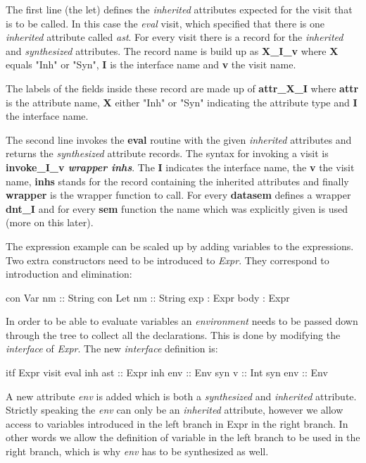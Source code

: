The first line (the let) defines the \emph{inherited} attributes expected for the visit that is to be called. In this case the \emph{eval} visit, which specified that there is one \emph{inherited} attribute called \emph{ast}. For every visit there is a record for the \emph{inherited} and \emph{synthesized} attributes. The record name is build up as \textbf{X\_I\_v} where \textbf{X} equals "Inh" or "Syn", \textbf{I} is the interface name and \textbf{v} the visit name.

The labels of the fields inside these record are made up of \textbf{attr\_X\_I} where \textbf{attr} is the attribute name, \textbf{X} either "Inh" or "Syn" indicating the attribute type and \textbf{I} the interface name.

The second line invokes the \textbf{eval} routine with the given \emph{inherited} attributes and returns the \emph{synthesized} attribute records. The syntax for invoking a visit is \textbf{invoke\_I\_v \emph{wrapper inhs}}. The \textbf{I} indicates the interface name, the \textbf{v} the visit name, \textbf{inhs} stands for the record containing the inherited attributes and finally \textbf{wrapper} is the wrapper function to call. For every \textbf{datasem} \rcore defines a wrapper \textbf{dnt\_I} and for every \textbf{sem} function the name which was explicitly given is used (more on this later).

The expression example can be scaled up by adding variables to the expressions. Two extra constructors need to be introduced to \emph{Expr}. They correspond to introduction and elimination:	

\begin{code}
  con Var
    nm      :: String
  con Let
    nm      :: String
    exp     :  Expr
    body    :  Expr
\end{code}

In order to be able to evaluate variables an \emph{environment} needs to be passed down through the tree to collect all the declarations. This is done by modifying the \emph{interface} of \emph{Expr}. The new \emph{interface} definition is:

\begin{code}
itf Expr
  visit eval 
    inh ast  :: Expr
    inh env  :: Env
    syn v    :: Int
    syn env  :: Env
\end{code}

A new attribute \emph{env} is added which is both a \emph{synthesized} and \emph{inherited} attribute. Strictly speaking the \emph{env} can only be an \emph{inherited} attribute, however we allow access to variables introduced in the left branch in Expr in the right branch. In other words we allow the definition of variable in the left branch to be used in the right branch, which is why \emph{env} has to be synthesized as well.

